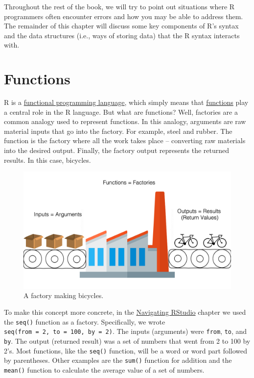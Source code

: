 \documentclass[
  letterpaper,
  DIV=11,
  numbers=noendperiod]{scrreprt}
\begin{document}
Throughout the rest of the book, we will try to point out situations
where R programmers often encounter errors and how you may be able to
address them. The remainder of this chapter will discuss some key
components of R's syntax and the data structures (i.e., ways of storing
data) that the R syntax interacts with.

\section{Functions}\label{functions}

R is a
\href{https://en.wikipedia.org/wiki/Functional_programming}{functional
programming language}, which simply means that
\hyperref[glossary-functions]{functions} play a central role in the R
language. But what are functions? Well, factories are a common analogy
used to represent functions. In this analogy, arguments are raw material
inputs that go into the factory. For example, steel and rubber. The
function is the factory where all the work takes place -- converting raw
materials into the desired output. Finally, the factory output
represents the returned results. In this case, bicycles.

\begin{figure}[H]

{\centering \includegraphics{chapters/speaking_r/factory1.png}

}

\caption{A factory making bicycles.}

\end{figure}%

To make this concept more concrete, in the
\href{../navigating_rstudio/navigating_rstudio.qmd}{Navigating RStudio}
chapter we used the \texttt{seq()} function as a factory. Specifically,
we wrote \texttt{seq(from\ =\ 2,\ to\ =\ 100,\ by\ =\ 2)}. The inputs
(arguments) were \texttt{from}, \texttt{to}, and \texttt{by}. The output
(returned result) was a set of numbers that went from 2 to 100 by 2's.
Most functions, like the \texttt{seq()} function, will be a word or word
part followed by parentheses. Other examples are the \texttt{sum()}
function for addition and the \texttt{mean()} function to calculate the
average value of a set of numbers.
\end{document}
